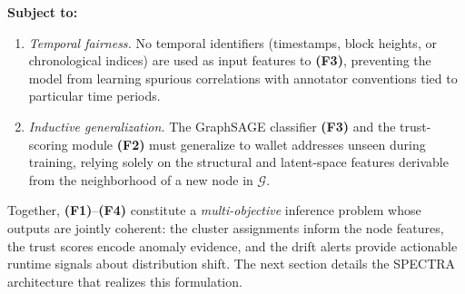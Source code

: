 \begin{mdframed}[linewidth=0.8pt, innertopmargin=8pt, innerbottommargin=8pt,
                 innerleftmargin=10pt, innerrightmargin=10pt]
\begin{problem}
\medskip
\textbf{Subject to:}
\begin{enumerate}
  \item[\textbf{(S1)}] \emph{Temporal fairness.} No temporal identifiers
        (timestamps, block heights, or chronological indices) are used as
        input features to \textbf{(F3)}, preventing the model from learning
        spurious correlations with annotator conventions tied to particular
        time periods.
  \item[\textbf{(S2)}] \emph{Inductive generalization.} The GraphSAGE
        classifier \textbf{(F3)} and the trust-scoring module \textbf{(F2)}
        must generalize to wallet addresses unseen during training, relying
        solely on the structural and latent-space features derivable from
        the neighborhood of a new node in $\mathcal{G}$.
\end{enumerate}
\end{problem}
\end{mdframed}

\noindent
Together, \textbf{(F1)}--\textbf{(F4)} constitute a \emph{multi-objective}
inference problem whose outputs are jointly coherent: the cluster assignments
inform the node features, the trust scores encode anomaly evidence, and the
drift alerts provide actionable runtime signals about distribution shift.
The next section details the SPECTRA architecture that realizes this
formulation.
